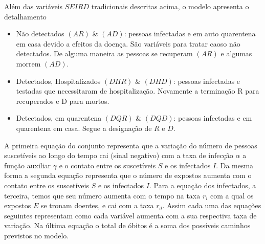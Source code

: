 \documentclass[12pt]{article}
\begin{document}
Além das variáveis $SEIRD$ tradicionais descritas acima, o modelo apresenta o detalhamento 
\begin{itemize}
\item Não detectados $(AR)$ \& $(AD)$: pessoas infectadas e em auto quarentena em casa devido a efeitos da doença. São variáveis para tratar caoso não detectados. De alguma maneira as pessoas se recuperam $(AR)$ e algumas morrem  $(AD)$.

\item Detectados, Hospitalizados $(DHR)$ \& $(DHD)$: pessoas infectadas e testadas que necessitaram de hospitalização. Novamente a terminação R para recuperados e D para mortos.

\item Detectados, em quarentena $(DQR)$ \& $(DQD)$: pessoas infectadas e em quarentena em casa. Segue a designação de $R$ e $D$.

\end{itemize}

A primeira equação do conjunto representa que a variação do número de pessoas suscetíveis ao longo do tempo cai (sinal negativo) com a taxa de infecção $\alpha$ a função auxiliar $\gamma$ e o contato entre os suscetíveis $S$ e os infectados $I$. Da mesma forma a segunda equação representa que o número de expostos aumenta com o contato entre os suscetíveis $S$ e os infectados $I$. Para a equação dos infectados, a terceira, temos que seu número aumenta com o tempo na taxa $r_i$ com a qual os expostos $E$ se tronam doentes, e cai com a taxa $r_d$. Assim cada uma das equações seguintes representam como cada variável aumenta com a sua respectiva taxa de variação.  Na última equação o total de óbitos é a soma dos possíveis caminhos previstos no modelo.
\end{document}
